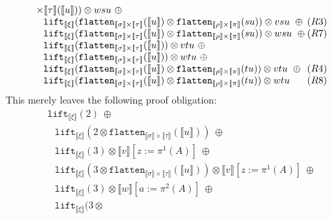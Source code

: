 \documentclass[a4paper,UKenglish,cleveref,autoref,numberwithinsect]{lipics-v2019}
\theoremstyle{definition}
\newcommand{\flatten}{\mathtt{flatten}}
\newcommand{\lift}{\mathtt{lift}}
\newcommand{\typeinterpret}[1]{\llbracket #1 \rrbracket}
\newcommand{\interpret}[1]{\llbracket #1 \rrbracket}
\begin{document}
\begin{itemize}
\[\begin{array}{l}
{    \times \typeinterpret{\tau}}(\interpret{u})) \otimes wsu\ \oplus \\
  \phantom{A}
    \lift_{\typeinterpret{\xi}}(\flatten_{\typeinterpret{\sigma}
    \times \typeinterpret{\tau}}(\interpret{u}) \otimes
    \flatten_{\typeinterpret{\rho} \times
    \typeinterpret{\pi}}(su)) \otimes vsu\ \oplus \hfill (R3) \\
  \phantom{A}
    \lift_{\typeinterpret{\xi}}(\flatten_{\typeinterpret{\sigma}
    \times \typeinterpret{\tau}}(\interpret{u}) \otimes
    \flatten_{\typeinterpret{\rho}
    \times \typeinterpret{\pi}}(su)) \otimes wsu\ \oplus \hfill (R7) \\
  \phantom{A}
    \lift_{\typeinterpret{\xi}}(\flatten_{\typeinterpret{\sigma}
    \times \typeinterpret{\tau}}(\interpret{u})) \otimes vtu\ \oplus \\
  \phantom{A}
    \lift_{\typeinterpret{\xi}}(\flatten_{\typeinterpret{\sigma}
    \times \typeinterpret{\tau}}(\interpret{u})) \otimes wtu\ \oplus \\
  \phantom{A}
    \lift_{\typeinterpret{\xi}}(\flatten_{\typeinterpret{\sigma}
    \times \typeinterpret{\tau}}(\interpret{u}) \otimes
    \flatten_{\typeinterpret{\rho} \times
    \typeinterpret{\pi}}(tu)) \otimes vtu\ \oplus \hfill (R4) \\
  \phantom{A}
    \lift_{\typeinterpret{\xi}}(\flatten_{\typeinterpret{\sigma}
    \times \typeinterpret{\tau}}(\interpret{u}) \otimes
    \flatten_{\typeinterpret{\rho}
    \times \typeinterpret{\pi}}(tu)) \otimes wtu \hfill (R8)
  \end{array}
  \]
  This merely leaves the following proof obligation:
  \[
  \begin{array}{l}
  \lift_{\typeinterpret{\xi}}(2)\ \oplus \\
  \phantom{A}
     \lift_{\typeinterpret{\xi}}(2 \otimes
      \flatten_{\typeinterpret{\sigma} \times \typeinterpret{\tau}}(
      \interpret{u}))\ \oplus \\
  \phantom{A}
    \lift_{\typeinterpret{\xi}}(3) \otimes \interpret{v}[z:=\pi^1(A)]
    \ \oplus \\
  \phantom{A}
    \lift_{\typeinterpret{\xi}}(3 \otimes
    \flatten_{\typeinterpret{\sigma} \times \typeinterpret{\tau}}(
    \interpret{u})) \otimes
     \interpret{v}[z:=\pi^1(A)]
    \ \oplus \\
  \phantom{A}
    \lift_{\typeinterpret{\xi}}(3) \otimes \interpret{w}[a:=\pi^2(A)]
    \ \oplus \\
  \phantom{A}
    \lift_{\typeinterpret{\xi}}(3 \otimes

\end{array}\]
\end{itemize}
\end{document}
